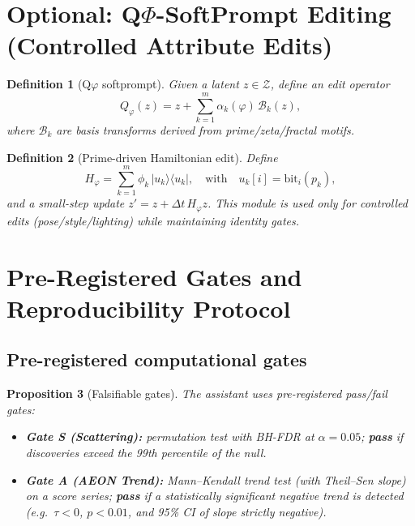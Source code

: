 \documentclass[12pt]{amsart}
\numberwithin{equation}{section}
\newtheorem{definition}{Definition}[section]
\newtheorem{proposition}[definition]{Proposition}
\newcommand{\cZ}{\mathcal{Z}}
\newcommand{\phiGR}{\varphi}
\begin{document}
\section{Optional: Q$\Phi$-SoftPrompt Editing (Controlled Attribute Edits)}
\begin{definition}[Q$\phiGR$ softprompt]
Given a latent $z\in\cZ$, define an edit operator
\[
Q_{\phiGR}(z)=z+\sum_{k=1}^m \alpha_k(\phiGR)\,\mathcal{B}_k(z),
\]
where $\mathcal{B}_k$ are basis transforms derived from prime/zeta/fractal motifs.
\end{definition}
\begin{definition}[Prime-driven Hamiltonian edit]
Define
\[
H_{\phiGR}=\sum_{k=1}^m \phi_k\,|u_k\rangle\langle u_k|,
\quad\text{with}\quad u_k[i]=\mathrm{bit}_i(p_k),
\]
and a small-step update $z' = z + \Delta t\, H_{\phiGR} z$.
This module is used only for \emph{controlled} edits (pose/style/lighting) while maintaining identity gates.
\end{definition}
\section{Pre-Registered Gates and Reproducibility Protocol}
\subsection{Pre-registered computational gates}
\begin{proposition}[Falsifiable gates]
The assistant uses pre-registered pass/fail gates:
\begin{itemize}
\item \textbf{Gate S (Scattering):} permutation test with BH-FDR at $\alpha=0.05$;
\textbf{pass} if discoveries exceed the 99th percentile of the null.
\item \textbf{Gate A (AEON Trend):} Mann--Kendall trend test (with Theil--Sen slope) on a score series;
\textbf{pass} if a statistically significant negative trend is detected (e.g.\ $\tau<0$, $p<0.01$,
and 95\% CI of slope strictly negative).
\end{itemize}
\end{proposition}
\end{document}
